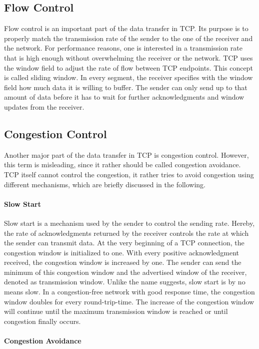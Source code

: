 \subsection*{Flow Control}

Flow control is an important part of the data transfer in TCP. Its purpose is to properly match the transmission rate of the sender to the one of the receiver and the network. For performance reasons, one is interested in a transmission rate that is high enough without overwhelming the receiver or the network. TCP uses the window field to adjust the rate of flow between TCP endpoints. This concept is called sliding window. In every segment, the receiver specifies with the window field how much data it is willing to buffer. The sender can only send up to that amount of data before it has to wait for further acknowledgments and window updates from the receiver. 

\subsection*{Congestion Control}

Another major part of the data transfer in TCP is congestion control. However, this term is misleading, since it rather should be called congestion avoidance. TCP itself cannot control the congestion, it rather tries to avoid congestion using different mechanisms, which are briefly discussed in the following. 

\paragraph{Slow Start}

Slow start is a mechanism used by the sender to control the sending rate. Hereby, the rate of acknowledgments returned by the receiver controls the rate at which the sender can transmit data. At the very beginning of a TCP connection, the congestion window is initialized to one. With every positive acknowledgment received, the congestion window is increased by one. The sender can send the minimum of this congestion window and the advertised window of the receiver, denoted as transmission window. Unlike the name suggests, slow start is by no means slow. In a congestion-free network with good response time, the congestion window doubles for every round-trip-time. The increase of the congestion window will continue until the maximum transmission window is reached or until congestion finally occurs.

\paragraph{Congestion Avoidance}

